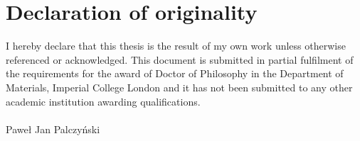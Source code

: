 \section*{Declaration of originality}

I hereby declare that this thesis is the result of my own work unless otherwise referenced or acknowledged. This document is submitted in partial fulfilment of the requirements for the award of Doctor of Philosophy in the Department of Materials, Imperial College London and it has not been submitted to any other academic institution awarding qualifications.\\ \\

Paweł Jan Palczyński